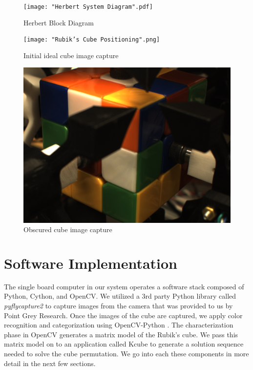 \documentclass[final, letterpaper, 10 pt, conference, twocolumn]{IEEEtran}
\begin{document}
\begin{figure}[!ht]
\centering
\texttt{[image: "Herbert System Diagram".pdf]}
\caption{Herbert Block Diagram}
\label{fig:System Block Diagram}
\end{figure}

\begin{figure}[!ht]
\centering
\texttt{[image: "Rubik's Cube Positioning".png]}
\caption{Initial ideal cube image capture}
\label{fig:Camera Positioning}
\end{figure}

\begin{figure}[!ht]
\centering
\includegraphics[scale=0.15]{actual_cube_capture.png}
\caption{Obscured cube image capture}
\label{fig:Obscured Cube}
\end{figure}

\section{Software Implementation}
\label{sec:Software Implementation}
The single board computer in our system operates a software stack composed of Python, Cython, and OpenCV. We utilized a 3rd party Python library called \textit{pyflycapture2} \cite{pyflycapture2} to capture images from the camera that was provided to us by Point Grey Research. Once the images of the cube are captured, we apply color recognition and categorization using OpenCV-Python \cite{OpenCVPython}. The characterization phase in OpenCV generates a matrix model of the Rubik's cube. We pass this matrix model on to an application called Kcube to generate a solution sequence needed to solve the cube permutation. We go into each these components in more detail in the next few sections.
\end{document}
